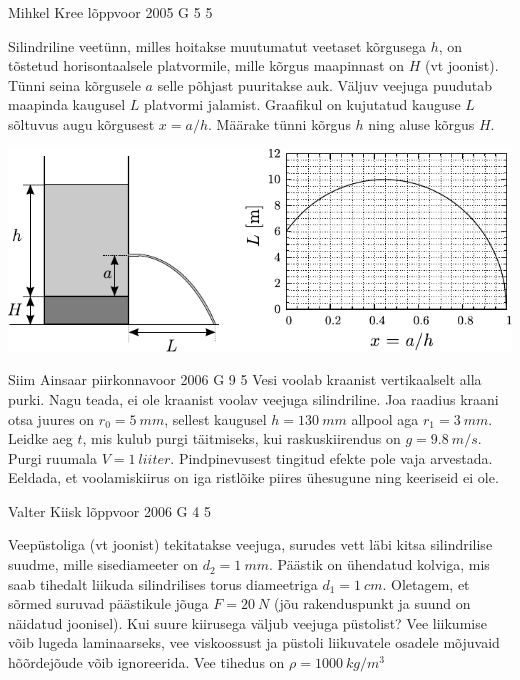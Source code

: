 \documentclass[11pt, twoside]{article}
\begin{document}
{%
{Mihkel Kree} %
{lõppvoor} %
{2005} %
{G 5} %
{5} %
{
\ifStatement
Silindriline veetünn, milles hoitakse muutumatut veetaset kõrgusega $h$, on tõstetud horisontaalsele platvormile, mille kõrgus maapinnast on $H$ (vt joonist). Tünni seina kõrgusele $a$ selle põhjast puuritakse auk. Väljuv veejuga puudutab maapinda kaugusel $L$ platvormi jalamist. Graafikul on kujutatud kauguse $L$ sõltuvus augu kõrgusest $x = a/h$. Määrake tünni kõrgus $h$ ning aluse kõrgus $H$.

\begin{center}
	\includegraphics[width=\linewidth]{2005-v3g-05-yl}
\end{center}
\fi
}

{Siim Ainsaar} %
{piirkonnavoor} %
{2006} %
{G 9} %
{5} %
{
\ifStatement
Vesi voolab kraanist vertikaalselt alla purki. Nagu teada, ei ole kraanist voolav veejuga silindriline. Joa raadius kraani otsa juures on $r_0 = \SI{5}{mm}$, sellest kaugusel $h = \SI{130}{mm}$ allpool aga $r_1 = \SI{3}{mm}$. Leidke aeg $t$, mis kulub purgi täitmiseks, kui raskuskiirendus on $g = \SI{9,8}{m/s}$. Purgi ruumala $V = \SI{1}{liiter}$. Pindpinevusest tingitud efekte pole vaja arvestada. Eeldada, et voolamiskiirus on iga ristlõike piires ühesugune ning keeriseid ei ole. 
\fi
}

{Valter Kiisk} %
{lõppvoor} %
{2006} %
{G 4} %
{5} %
{
\ifStatement
Veepüstoliga (vt joonist) tekitatakse veejuga, surudes vett läbi kitsa silindrilise suudme, mille sisediameeter on $d_2 = \SI{1}{mm}$. Päästik on ühendatud kolviga, mis saab tihedalt liikuda silindrilises torus diameetriga $d_1 = \SI{1}{cm}$. Oletagem, et sõrmed suruvad päästikule jõuga $F = \SI{20}{N}$ (jõu rakenduspunkt ja suund on näidatud joonisel). Kui suure kiirusega väljub veejuga püstolist? Vee liikumise võib lugeda laminaarseks, vee viskoossust ja püstoli liikuvatele osadele mõjuvaid hõõrdejõude võib ignoreerida. Vee tihedus on $\rho = \SI{1000}{kg/m^3}$

}}
\end{document}
